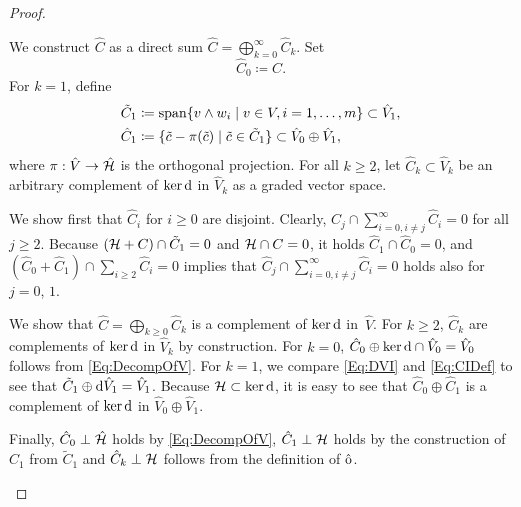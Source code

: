 \documentclass[\MainFolder/Text.tex]{subfiles}
\begin{document}
\begin{proof}
\begin{description}[leftmargin=0pt,font=\normalfont\itshape]
\item[Construction of $\hat{C}$:]
We construct $\hat{C}$ as a direct sum $\hat{C} = \bigoplus_{k=0}^\infty \hat{C}_k$. 
Set 
\[
\hat{C}_0 \coloneqq C.
\]
For $k=1$, define
\begin{equation}\label{Eq:CIDef}
\begin{aligned}
 \tilde{C}_1 &\coloneqq \mathrm{span}\{v \wedge w_i \mid v\in V, i=1, \dotsc,m\} \subset \hat{V}_1, \\
  \hat{C}_1 &\coloneqq \{\tilde{c} - \pi(\tilde{c}) \mid \tilde{c}\in \tilde{C}_1\}\subset\hat{V}_0\oplus\hat{V}_1,
\end{aligned}
\end{equation}
where $\pi: \hat{V}\rightarrow\hat{\mathcal{H}}$ is the orthogonal projection.
For all $k\ge 2$, let $\hat{C}_k \subset \hat{V}_k$ be an arbitrary complement of $\ker\mathrm{d}$ in $\hat{V}_k$ as a graded vector space.

We show first that $\hat{C}_i$ for $i\ge 0$ are disjoint.
Clearly, $\hat{C}_j \cap \sum_{i=0, i\neq j}^\infty \hat{C}_i = 0$ for all $j\ge 2$.
Because $(\mathcal{H} + C)\cap\tilde{C}_1 = 0$ and $\mathcal{H} \cap C = 0$, it holds $\hat{C}_1 \cap \hat{C}_0 = 0$, and $(\hat{C}_0 + \hat{C}_1) \cap \sum_{i\ge 2} \hat{C}_i = 0$ implies that $\hat{C}_j \cap \sum_{i=0, i\neq j}^\infty \hat{C}_i = 0$ holds also for $j=0$, $1$.

We show that $\hat{C}=\bigoplus_{k\ge 0}\hat{C}_k$ is a complement of $\ker \mathrm{d}$ in~$\hat{V}$.
For $k\ge 2$, $\hat{C}_k$ are complements of $\ker \mathrm{d}$ in $\hat{V}_k$ by construction.
For $k=0$, $\hat{C}_0 \oplus \ker \mathrm{d} \cap \hat{V}_0 = \hat{V}_0$ follows from \eqref{Eq:DecompOfV}. 
For $k=1$, we compare \eqref{Eq:DVI} and \eqref{Eq:CIDef} to see that $\tilde{C}_1 \oplus \mathrm{d} \hat{V}_1 = \hat{V}_1$.
Because $\mathcal{H}\subset \ker \mathrm{d}$, it is easy to see that $\hat{C}_0\oplus\hat{C}_1$ is a complement of $\ker \mathrm{d}$ in $\hat{V}_0\oplus\hat{V}_1$.

Finally, $\hat{C}_0 \perp \hat{\mathcal{H}}$ holds by \eqref{Eq:DecompOfV}, $\hat{C}_1\perp\mathcal{H}$ holds by the construction of $\hat{C}_1$ from $\tilde{C}_1$ and $\hat{C}_k \perp \mathcal{H}$ follows from the definition of $\hat{\mathrm{o}}$.


\end{description}
\end{proof}
\end{document}
